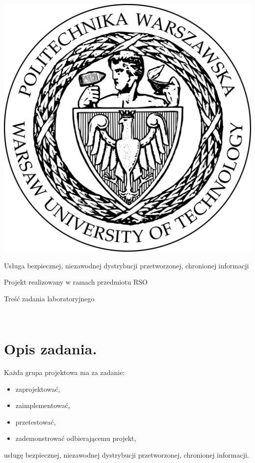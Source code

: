 \documentclass[a4paper,11pt]{article}
\author{
  Tomasz Jordan Kruk
}
\date{4 marca 2016}
\begin{document}
\makeatletter
\begin{titlepage}

\begin{center}
  \includegraphics[scale=0.1]{Logo_PW_black.png} \\
  \vspace{50pt}
  
  {\LARGE Usługa bezpiecznej, niezawodnej dystrybucji przetworzonej, chronionej informacji} \\
  \vspace{10pt}
  
  {\large Projekt realizowany w ramach przedmiotu RSO} \\
  \vspace{40pt}
  
  {\Huge Treść zadania laboratoryjnego} \\
  \vspace{30pt}
  
  {\@author} \\
  \vspace{10pt}
  
  {\@date}
\end{center}

\end{titlepage}
\makeatother

\section{Opis zadania.}
  Każda grupa projektowa ma za zadanie:
  \begin{itemize}
    \item zaprojektować,
    \item zaimplementować,
    \item przetestować,
    \item zademonstrować odbierającemu projekt,
  \end{itemize}
  usługę bezpiecznej, niezawodnej dystrybucji przetworzonej, chronionej informacji.
  
\end{document}

